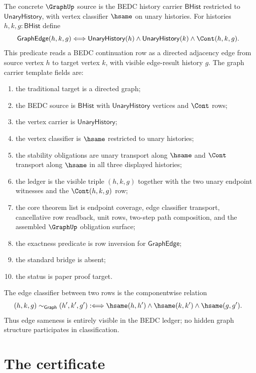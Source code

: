 \begin{definition}
\label{def:graph-cont-adjacency-carrier}
The concrete $\GraphUp$ source is the BEDC history carrier
$\mathsf{BHist}$ restricted to $\mathsf{UnaryHistory}$, with vertex classifier
$\hsame$ on unary histories. For histories $h,k,g:\mathsf{BHist}$ define
$$
\mathsf{GraphEdge}(h,k,g)
\Longleftrightarrow
\mathsf{UnaryHistory}(h)\land
\mathsf{UnaryHistory}(k)\land
\Cont(h,k,g).
$$
This predicate reads a BEDC continuation row as a directed adjacency edge from
source vertex $h$ to target vertex $k$, with visible edge-result history $g$.
The graph carrier template fields are:
\begin{enumerate}
\item the traditional target is a directed graph;
\item the BEDC source is $\mathsf{BHist}$ with
$\mathsf{UnaryHistory}$ vertices and $\Cont$ rows;
\item the vertex carrier is $\mathsf{UnaryHistory}$;
\item the vertex classifier is $\hsame$ restricted to unary histories;
\item the stability obligations are unary transport along $\hsame$ and
$\Cont$ transport along $\hsame$ in all three displayed histories;
\item the ledger is the visible triple $(h,k,g)$ together with the two unary
endpoint witnesses and the $\Cont(h,k,g)$ row;
\item the core theorem list is endpoint coverage, edge classifier transport,
cancellative row readback, unit rows, two-step path composition, and the
assembled $\GraphUp$ obligation surface;
\item the exactness predicate is row inversion for $\mathsf{GraphEdge}$;
\item the standard bridge is absent;
\item the status is paper proof target.
\end{enumerate}
The edge classifier between two rows is the componentwise relation
$$
(h,k,g)\sim_{\mathsf{Graph}}(h',k',g')
:\Longleftrightarrow
\hsame(h,h')\wedge
\hsame(k,k')\wedge
\hsame(g,g').
$$
Thus edge sameness is entirely visible in the BEDC ledger; no hidden graph
structure participates in classification.
\end{definition}

\section{The certificate}
\label{sec:graph-certificate}


